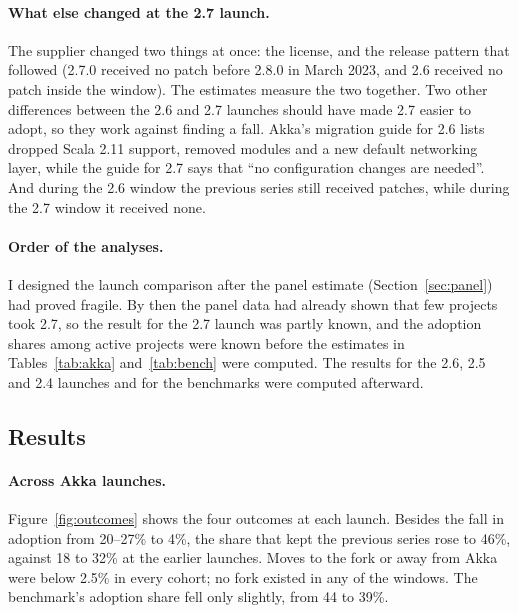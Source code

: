 \documentclass[11pt]{article}
\begin{document}
\paragraph{What else changed at the 2.7 launch.} The supplier changed two things at once: the license, and the release pattern that followed (2.7.0 received no patch before 2.8.0 in March 2023, and 2.6 received no patch inside the window). The estimates measure the two together. Two other differences between the 2.6 and 2.7 launches should have made 2.7 easier to adopt, so they work against finding a fall. Akka's migration guide for 2.6 lists dropped Scala 2.11 support, removed modules and a new default networking layer, while the guide for 2.7 says that ``no configuration changes are needed''. And during the 2.6 window the previous series still received patches, while during the 2.7 window it received none.

\paragraph{Order of the analyses.} I designed the launch comparison after the panel estimate (Section~\ref{sec:panel}) had proved fragile. By then the panel data had already shown that few projects took 2.7, so the result for the 2.7 launch was partly known, and the adoption shares among active projects were known before the estimates in Tables~\ref{tab:akka} and~\ref{tab:bench} were computed. The results for the 2.6, 2.5 and 2.4 launches and for the benchmarks were computed afterward.

\subsection{Results}


\paragraph{Across Akka launches.} Figure~\ref{fig:outcomes} shows the four outcomes at each launch. Besides the fall in adoption from 20--27\% to 4\%, the share that kept the previous series rose to 46\%, against 18 to 32\% at the earlier launches. Moves to the fork or away from Akka were below 2.5\% in every cohort; no fork existed in any of the windows. The benchmark's adoption share fell only slightly, from 44 to 39\%.
\end{document}
